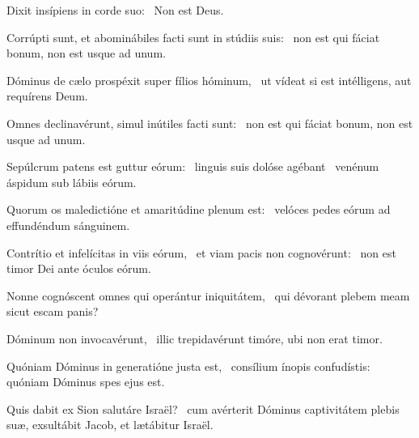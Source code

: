 \item Dixit insípiens in corde suo:~\psstar{} Non est Deus.

\item Corrúpti sunt, et abominábiles facti sunt in stúdiis suis:~\psstar{} non est qui fáciat bonum, non est usque ad unum.

\item Dóminus de cælo prospéxit super fílios hóminum,~\psstar{} ut vídeat si est intélligens, aut requírens Deum.

\item Omnes declinavérunt, simul inútiles facti sunt:~\psstar{} non est qui fáciat bonum, non est usque ad unum.

\item Sepúlcrum patens est guttur eórum:~\pscross{} linguis suis dolóse agébant~\psstar{} venénum áspidum sub lábiis eórum.

\item Quorum os maledictióne et amaritúdine plenum est:~\psstar{} velóces pedes eórum ad effundéndum sánguinem.

\item Contrítio et infelícitas in viis eórum,~\pscross{} et viam pacis non cognovérunt:~\psstar{} non est timor Dei ante óculos eórum.

\item Nonne cognóscent omnes qui operántur iniquitátem,~\psstar{} qui dévorant plebem meam sicut escam panis?

\item Dóminum non invocavérunt,~\psstar{} illic trepidavérunt timóre, ubi non erat timor.

\item Quóniam Dóminus in generatióne justa est,~\pscross{} consílium ínopis confudístis:~\psstar{} quóniam Dóminus spes ejus est.

\item Quis dabit ex Sion salutáre Israël?~\psstar{} cum avérterit Dóminus captivitátem plebis suæ, exsultábit Jacob, et lætábitur Israël.
